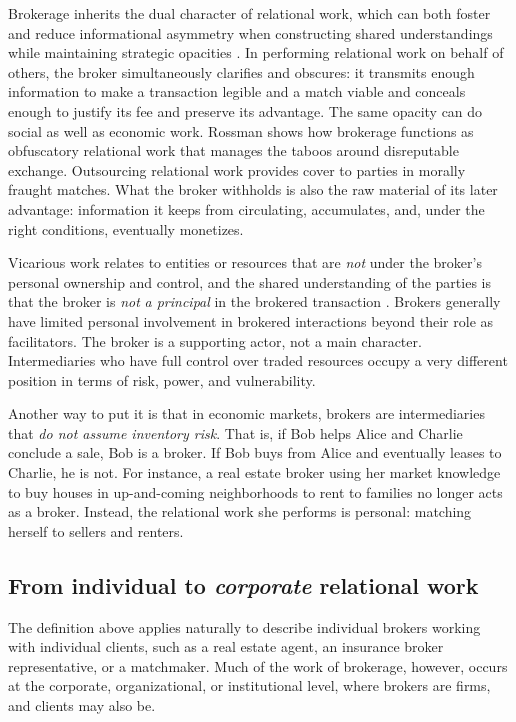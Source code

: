 \documentclass[
]{article}
\begin{document}
Brokerage inherits the dual character of relational work, which can both foster and reduce informational asymmetry when constructing shared understandings while maintaining strategic opacities \autocite[138]{blockRelationalWorkMarket2012}. In performing relational work on behalf of others, the broker simultaneously clarifies and obscures: it transmits enough information to make a transaction legible and a match viable and conceals enough to justify its fee and preserve its advantage. The same opacity can do social as well as economic work. Rossman \autocite*{rossmanObfuscatoryRelationalWork2014} shows how brokerage functions as obfuscatory relational work that manages the taboos around disreputable exchange. Outsourcing relational work provides cover to parties in morally fraught matches. What the broker withholds is also the raw material of its later advantage: information it keeps from circulating, accumulates, and, under the right conditions, eventually monetizes.

Vicarious work relates to entities or resources that are \emph{not} under the broker's personal ownership and control, and the shared understanding of the parties is that the broker is \emph{not} \emph{a principal} in the brokered transaction \autocite[see e.g.][21326]{stovelStabilizingBrokerage2011}. Brokers generally have limited personal involvement in brokered interactions beyond their role as facilitators. The broker is a supporting actor, not a main character. Intermediaries who have full control over traded resources occupy a very different position in terms of risk, power, and vulnerability.

Another way to put it is that in economic markets, brokers are intermediaries that \emph{do not assume inventory risk}. That is, if Bob helps Alice and Charlie conclude a sale, Bob is a broker. If Bob buys from Alice and eventually leases to Charlie, he is not. For instance, a real estate broker using her market knowledge to buy houses in up-and-coming neighborhoods to rent to families no longer acts as a broker. Instead, the relational work she performs is personal: matching herself to sellers and renters.

\subsection{\texorpdfstring{From individual to \emph{corporate} relational work}{From individual to corporate relational work}}

The definition above applies naturally to describe individual brokers working with individual clients, such as a real estate agent, an insurance broker representative, or a matchmaker. Much of the work of brokerage, however, occurs at the corporate, organizational, or institutional level, where brokers are firms, and clients may also be.
\end{document}
